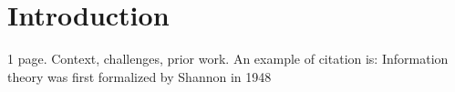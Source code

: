 \section{Introduction}
1 page. Context, challenges, prior work.
An example of citation is: Information theory was first
formalized by Shannon in 1948
